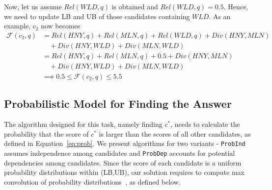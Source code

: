 \begin{comment}
    \begin{align*}
\text{LB}(c_i) &= \text{MIN\_SCORE} = 0 \quad \forall c_i \in \text{candidates} \\
\text{UB}(c_i) &= \text{MAX\_SCORE} = 6 \quad \forall c_i \in \text{candidates}
\end{align*}

Hence, We can represent the initial candidates set with their corresponding bounds as follows:

\[
    \text{C} = 
    \begin{cases}
    c_1 = \{ \text{HNY}, \text{MLN}, \text{HYN} \}, & c_2 = \{ \text{HNY}, \text{MLN}, \text{SHN} \} \\
    c_3 = \{ \text{HNY}, \text{MLN}, \text{WLD} \}, & c_4 = \{ \text{HNY}, \text{HYN}, \text{SHN} \} \\
    c_5 = \{ \text{HNY}, \text{HYN}, \text{WLD} \}, & c_6 = \{ \text{HNY}, \text{SHN}, \text{WLD} \} \\
    c_7 = \{ \text{MLN}, \text{HYN}, \text{SHN} \}, & c_8 = \{ \text{MLN}, \text{HYN}, \text{WLD} \} \\
    c_9 = \{ \text{MLN}, \text{SHN}, \text{WLD} \}, & c_{10} = \{ \text{HYN}, \text{SHN}, \text{WLD} \} 
    \end{cases}
\]

\[
\text{C\_bounds} = \{ c_1: (0, 6), c_2: (0, 6), c_3: (0, 6), \ldots, c_{10}: (0, 6) \}
\]

\end{comment}

Now, let us assume \( Rel(WLD, q) \) is obtained and \( Rel(WLD, q) = 0.5 \). Hence, we need to update LB and UB of those candidates containing \( WLD \). As an example, $c_2$ now becomes
\begin{align*}
\mathcal{F}(c_2, q) & = Rel(HNY, q) + Rel(MLN, q) + Rel(WLD, q) + Div(HNY, MLN) \\
          & \quad + Div(HNY, WLD) + Div(MLN, WLD) \\
          & = Rel(HNY, q) + Rel(MLN, q) + 0.5 + Div(HNY, MLN) \\
          & \quad + Div(HNY, WLD) + Div(MLN, WLD) \\
          & \implies 0.5 \leq \mathcal{F}(c_2, q) \leq 5.5
\end{align*}





\subsection{Probabilistic Model for Finding the Answer}
\label{winning_probability}
The algorithm designed for this task, namely finding $c^*$, needs to calculate the probability that the score of $c^*$ is larger than the scores of all other candidates, as defined in Equation~\ref{eq:prob}. We present algorithms for two variants - {\tt ProbInd} assumes independence among candidates and {\tt ProbDep} accounts for potential dependencies among candidates. Since the score of each candidate is a uniform probability distributions within (LB,UB), our solution requires to compute max convolution of probability distributions~\cite{rahman2015worker}, as defined below.

